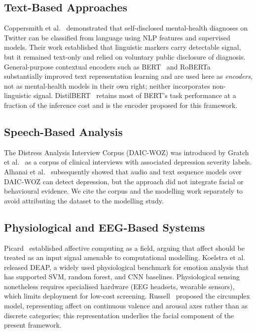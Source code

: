 \documentclass[12pt]{article}
\begin{document}
\subsection{Text-Based Approaches}

Coppersmith et al.~\cite{coppersmith2015mental} demonstrated that
self-disclosed mental-health diagnoses on Twitter can be classified from
language using NLP features and supervised models. Their work established
that linguistic markers carry detectable signal, but it remained
text-only and relied on voluntary public disclosure of diagnosis.
General-purpose contextual encoders such as BERT~\cite{devlin2019bert}
and RoBERTa~\cite{liu2019roberta} substantially improved text
representation learning and are used here as \emph{encoders}, not as
mental-health models in their own right; neither incorporates
non-linguistic signal. DistilBERT~\cite{sanh2019distilbert} retains most
of BERT's task performance at a fraction of the inference cost and is
the encoder proposed for this framework.

\subsection{Speech-Based Analysis}

The Distress Analysis Interview Corpus (DAIC-WOZ) was introduced by
Gratch et al.~\cite{gratch2014daic} as a corpus of clinical interviews
with associated depression severity labels. Alhanai et
al.~\cite{alhanai2018daic} subsequently showed that audio and text
sequence models over DAIC-WOZ can detect depression, but the approach
did not integrate facial or behavioural evidence. We cite the corpus and
the modelling work separately to avoid attributing the dataset to the
modelling study.

\subsection{Physiological and EEG-Based Systems}

Picard~\cite{picard1997affective} established affective computing as a
field, arguing that affect should be treated as an input signal amenable
to computational modelling. Koelstra et al.~\cite{koelstra2012deap}
released DEAP, a widely used physiological benchmark for emotion
analysis that has supported SVM, random forest, and CNN baselines.
Physiological sensing nonetheless requires specialised hardware (EEG
headsets, wearable sensors), which limits deployment for low-cost
screening. Russell~\cite{russell1980circumplex} proposed the
circumplex model, representing affect on continuous valence and arousal
axes rather than as discrete categories; this representation underlies
the facial component of the present framework.
\end{document}
